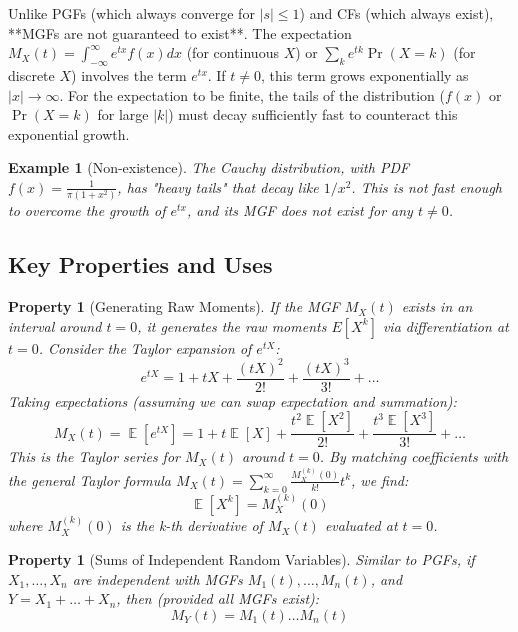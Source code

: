 \documentclass[11pt, letterpaper]{article}
\newtheorem{property}[theorem]{Property}
\newtheorem{example}[theorem]{Example}
\DeclareMathOperator{\E}{\mathbb{E}}
\begin{document}
Unlike PGFs (which always converge for $|s|\le 1$) and CFs (which always exist), **MGFs are not guaranteed to exist**.
The expectation $M_X(t) = \int_{-\infty}^{\infty} e^{tx} f(x) dx$ (for continuous $X$) or $\sum_k e^{tk} \Pr(X=k)$ (for discrete $X$) involves the term $e^{tx}$.
If $t \neq 0$, this term grows exponentially as $|x| \to \infty$. For the expectation to be finite, the tails of the distribution ($f(x)$ or $\Pr(X=k)$ for large $|k|$) must decay sufficiently fast to counteract this exponential growth.

\begin{example}[Non-existence]
The Cauchy distribution, with PDF $f(x) = \frac{1}{\pi(1+x^2)}$, has "heavy tails" that decay like $1/x^2$. This is not fast enough to overcome the growth of $e^{tx}$, and its MGF does not exist for any $t \neq 0$.
\end{example}

\subsection{Key Properties and Uses}

\begin{property}[Generating Raw Moments]
If the MGF $M_X(t)$ exists in an interval around $t=0$, it generates the raw moments $E[X^k]$ via differentiation at $t=0$. Consider the Taylor expansion of $e^{tX}$:
$$ e^{tX} = 1 + tX + \frac{(tX)^2}{2!} + \frac{(tX)^3}{3!} + \dots $$
Taking expectations (assuming we can swap expectation and summation):
$$ M_X(t) = \E[e^{tX}] = 1 + t\E[X] + \frac{t^2\E[X^2]}{2!} + \frac{t^3\E[X^3]}{3!} + \dots $$
This is the Taylor series for $M_X(t)$ around $t=0$. By matching coefficients with the general Taylor formula $M_X(t) = \sum_{k=0}^\infty \frac{M_X^{(k)}(0)}{k!} t^k$, we find:
\begin{equation}
    \E[X^k] = M_X^{(k)}(0)
\end{equation}
where $M_X^{(k)}(0)$ is the k-th derivative of $M_X(t)$ evaluated at $t=0$.
\end{property}

\begin{property}[Sums of Independent Random Variables]
Similar to PGFs, if $X_1, \dots, X_n$ are independent with MGFs $M_1(t), \dots, M_n(t)$, and $Y = X_1 + \dots + X_n$, then (provided all MGFs exist):
\begin{equation}
    M_Y(t) = M_1(t) \dots M_n(t)
\end{equation}
\end{property}
\end{document}
